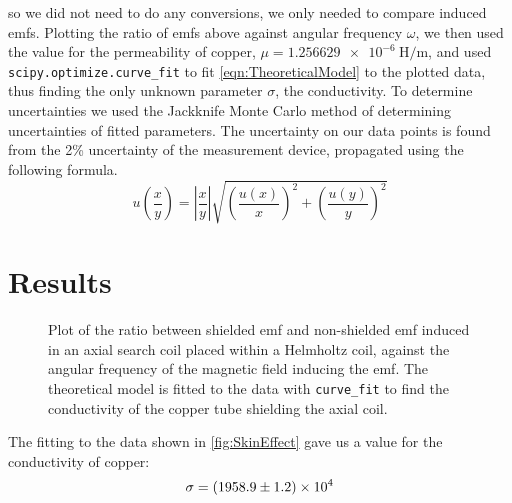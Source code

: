 \documentclass[12pt]{article}
\numberwithin{equation}{section}
\numberwithin{figure}{section}
\begin{document}
    so we did not need to do any conversions, we only needed to compare induced emfs. Plotting the 
    ratio of emfs above against angular frequency $\omega$, we then used the value for the 
    permeability of copper, $\mu=\SI{1.256629e-6}{\henry/\metre}$, and used 
    \texttt{scipy.optimize.curve\_fit} to fit \autoref{eqn:TheoreticalModel} to the plotted data, 
    thus finding the only unknown parameter $\sigma$, the conductivity. To determine uncertainties 
    we used the Jackknife Monte Carlo method of determining uncertainties of fitted parameters. 
    The uncertainty on our data points is found from the 2\% uncertainty of the measurement device, 
    propagated using the following formula. 
    \begin{equation*}
        u\left(\frac{x}{y}\right)=\left|\frac{x}{y}\right|\sqrt{\left(\frac{u(x)}{x}\right)^2+\left(\frac{u(y)}{y}\right)^2}
    \end{equation*}

    \section{Results}\label{sec:Results}
    \begin{figure}[H]
        \begin{center}
           \caption{Plot of the ratio between shielded emf and non-shielded emf induced in an axial 
           search coil placed within a Helmholtz coil, against the angular frequency of the magnetic 
           field inducing the emf. The theoretical model is fitted to the data with 
           \texttt{curve\_fit} to find the conductivity of the copper tube shielding the axial coil.}
           \label{fig:SkinEffect}
        \end{center}
    \end{figure}
    The fitting to the data shown in \autoref{fig:SkinEffect} gave us a value for the 
    conductivity of copper:
    \begin{equation*}
        \sigma=\num{1958.9\pm1.2e4}
    \end{equation*}
    
\end{document}
